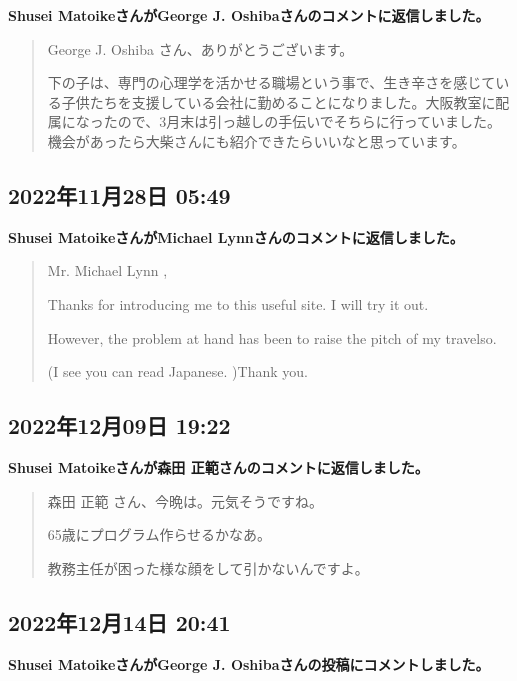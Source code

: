 \textbf{Shusei MatoikeさんがGeorge J. Oshibaさんのコメントに返信しました。}

\begin{quote}
George J. Oshiba さん、ありがとうございます。

下の子は、専門の心理学を活かせる職場という事で、生き辛さを感じている子供たちを支援している会社に勤めることになりました。大阪教室に配属になったので、3月末は引っ越しの手伝いでそちらに行っていました。機会があったら大柴さんにも紹介できたらいいなと思っています。
\end{quote}

\subsection*{2022年11月28日 05:49}

\textbf{Shusei MatoikeさんがMichael Lynnさんのコメントに返信しました。}

\begin{quote}
Mr. Michael Lynn ,

Thanks for introducing me to this useful site. I will try it out.

However, the problem at hand has been to raise the pitch of my travelso.

(I see you can read Japanese. )Thank you.
\end{quote}

\subsection*{2022年12月09日 19:22}

\textbf{Shusei Matoikeさんが森田 正範さんのコメントに返信しました。}

\begin{quote}
森田 正範 さん、今晩は。元気そうですね。

65歳にプログラム作らせるかなあ。

教務主任が困った様な顔をして引かないんですよ。
\end{quote}

\subsection*{2022年12月14日 20:41}

\textbf{Shusei MatoikeさんがGeorge J. Oshibaさんの投稿にコメントしました。}

